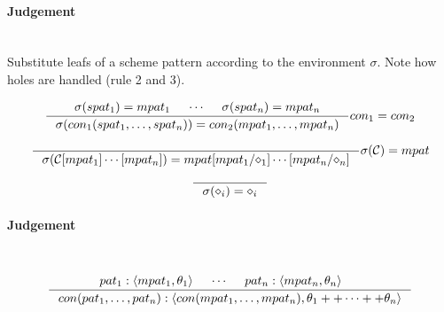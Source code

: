 \paragraph{Judgement} \\

Substitute leafs of a scheme pattern according to the environment $\sigma$. Note
how holes are handled (rule 2 and 3).

\[
\inference
{
  \sigma(spat_1) = mpat_1 &
  \cdots &
  \sigma(spat_n) = mpat_n
}
{
  \sigma (con_1 (spat_1, \ldots, spat_n)) =
  con_2 (mpat_1, \ldots, mpat_n)
}
{
  con_1 = con_2
}
\]

\[
\inference
{
}
{
  \sigma (\mathcal{C}[mpat_1]\cdots[mpat_n]) =
  mpat[mpat_1/\diamond_1]\cdots[mpat_n/\diamond_n]
}
{
  \sigma(\mathcal{C}) = mpat
}
\]

\[
\inference
{
}
{
  \sigma(\diamond_i) = \diamond_i
}
\]






\paragraph{Judgement} \\



\[
\inference
{
  pat_1 : \langle mpat_1, \theta_1 \rangle &
  \cdots &
  pat_n : \langle mpat_n, \theta_n \rangle &
}
{
  con (pat_1, \ldots, pat_n) :
  \langle con (mpat_1, \ldots, mpat_n), \theta_1 ++ \cdots ++
  \theta_n \rangle
}
\]

